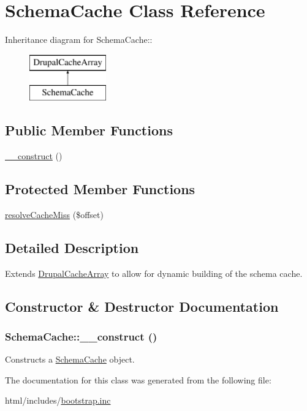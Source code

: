 \hypertarget{classSchemaCache}{
\section{SchemaCache Class Reference}
\label{classSchemaCache}
}
Inheritance diagram for SchemaCache::\begin{figure}[H]
\begin{center}
\leavevmode
\includegraphics[height=2cm]{classSchemaCache}
\end{center}
\end{figure}
\subsection*{Public Member Functions}
\begin{DoxyCompactItemize}
\item 
\hyperlink{classSchemaCache_ada562761e010404178ae0e0b29caf163}{\_\-\_\-construct} ()
\end{DoxyCompactItemize}
\subsection*{Protected Member Functions}
\begin{DoxyCompactItemize}
\item 
\hyperlink{group__schemaapi_gadb0a973c0269c37d3389946d5b57c01c}{resolveCacheMiss} (\$offset)
\end{DoxyCompactItemize}


\subsection{Detailed Description}
Extends \hyperlink{classDrupalCacheArray}{DrupalCacheArray} to allow for dynamic building of the schema cache. 

\subsection{Constructor \& Destructor Documentation}
\hypertarget{classSchemaCache_ada562761e010404178ae0e0b29caf163}{
\subsubsection[{\_\-\_\-construct}]{\setlength{\rightskip}{0pt plus 5cm}SchemaCache::\_\-\_\-construct ()}}
\label{classSchemaCache_ada562761e010404178ae0e0b29caf163}
Constructs a \hyperlink{classSchemaCache}{SchemaCache} object. 

The documentation for this class was generated from the following file:\begin{DoxyCompactItemize}
\item 
html/includes/\hyperlink{bootstrap_8inc}{bootstrap.inc}\end{DoxyCompactItemize}
